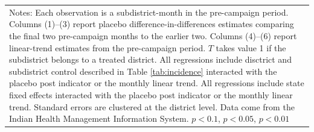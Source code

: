{{\begin{tabular}{l*{6}{c}}
\hline\hline
\multicolumn{7}{p{0.75\linewidth}}{\scriptsize Notes: Each observation is a subdistrict-month in the pre-campaign period. Columns (1)--(3) report placebo difference-in-differences estimates comparing the final two pre-campaign months to the earlier two. Columns (4)--(6) report linear-trend estimates from the pre-campaign period. \(T\) takes value 1 if the subdistrict belongs to a treated district. All regressions include disctrict and subdistrict control described in Table \ref{tab:incidence} interacted with the placebo post indicator or the monthly linear trend. All regressions include state fixed effects interacted with the placebo post indicator or the monthly linear trend. Standard errors are clustered at the district level. Data come from the Indian Health Management Information System. \sym{*} \(p<0.1\), \sym{**} \(p<0.05\), \sym{***} \(p<0.01\)}\\
\end{tabular}
}%

}

